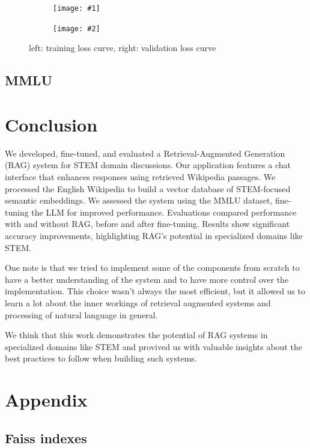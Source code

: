 \documentclass[11pt]{article}
\newcommand{\sideBySideImages}[5]{%
    \begin{figure}[ht]
        \centering
        \begin{subfigure}{#3\linewidth}
            \centering
            \texttt{[image: \#1]}
        \end{subfigure}%
        \hfill%
        \begin{subfigure}{#3\linewidth}
            \centering
            \texttt{[image: \#2]}
        \end{subfigure}
        \caption{#5}
        \label{#4}
    \end{figure}
}
\begin{document}
\sideBySideImages{figures/train-loss.png}{figures/val-loss.png}{0.48}{fig:training_curves}{left: training loss curve, right: validation loss curve}

\subsection{MMLU}

\section{Conclusion}
We developed, fine-tuned, and evaluated a Retrieval-Augmented Generation (RAG) 
system for STEM domain discussions. Our application features a chat interface 
that enhances responses using retrieved Wikipedia passages. We processed the 
English Wikipedia to build a vector database of STEM-focused semantic 
embeddings. 
We assessed the system using the MMLU 
dataset, fine-tuning the LLM for improved performance. Evaluations compared 
performance with and without RAG, before and after fine-tuning.
Results show significant accuracy improvements, highlighting RAG's potential 
in specialized domains like STEM.

One note is that we tried to implement some of the components from scratch
to have a better understanding of the system and to have more control over the
implementation.
This choice wasn't always the most efficient, but it allowed us to learn a lot
about the inner workings of retrieval augmented systems and processing of natural 
language in general. 

We think that this work demonstrates the potential of RAG systems in specialized 
domains like STEM and provived us with valuable insights about the best practices 
to follow when building such systems.

\newpage



\nocite{*}

\appendix

\section{Appendix}
\label{sec:appendix}

\subsection{Faiss indexes}
\end{document}
